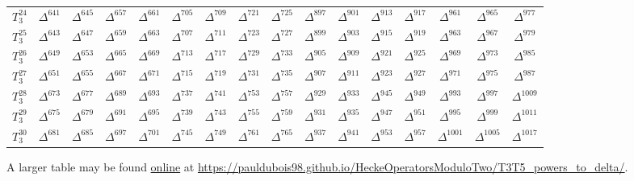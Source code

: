 \begin{center}
\begin{tabular}{|c||c|c|c|c|c|c|c|c|c|c|c|c|c|c|c|}
		$T_3^{24}$ & $\Delta^{641}$ & $\Delta^{645}$ & $\Delta^{657}$ & $\Delta^{661}$ & $\Delta^{705}$ & $\Delta^{709}$ & $\Delta^{721}$ & $\Delta^{725}$ & $\Delta^{897}$ & $\Delta^{901}$ & $\Delta^{913}$ & $\Delta^{917}$ & $\Delta^{961}$ & $\Delta^{965}$ & $\Delta^{977}$ \\
		$T_3^{25}$ & $\Delta^{643}$ & $\Delta^{647}$ & $\Delta^{659}$ & $\Delta^{663}$ & $\Delta^{707}$ & $\Delta^{711}$ & $\Delta^{723}$ & $\Delta^{727}$ & $\Delta^{899}$ & $\Delta^{903}$ & $\Delta^{915}$ & $\Delta^{919}$ & $\Delta^{963}$ & $\Delta^{967}$ & $\Delta^{979}$ \\
		$T_3^{26}$ & $\Delta^{649}$ & $\Delta^{653}$ & $\Delta^{665}$ & $\Delta^{669}$ & $\Delta^{713}$ & $\Delta^{717}$ & $\Delta^{729}$ & $\Delta^{733}$ & $\Delta^{905}$ & $\Delta^{909}$ & $\Delta^{921}$ & $\Delta^{925}$ & $\Delta^{969}$ & $\Delta^{973}$ & $\Delta^{985}$ \\
		$T_3^{27}$ & $\Delta^{651}$ & $\Delta^{655}$ & $\Delta^{667}$ & $\Delta^{671}$ & $\Delta^{715}$ & $\Delta^{719}$ & $\Delta^{731}$ & $\Delta^{735}$ & $\Delta^{907}$ & $\Delta^{911}$ & $\Delta^{923}$ & $\Delta^{927}$ & $\Delta^{971}$ & $\Delta^{975}$ & $\Delta^{987}$ \\
		$T_3^{28}$ & $\Delta^{673}$ & $\Delta^{677}$ & $\Delta^{689}$ & $\Delta^{693}$ & $\Delta^{737}$ & $\Delta^{741}$ & $\Delta^{753}$ & $\Delta^{757}$ & $\Delta^{929}$ & $\Delta^{933}$ & $\Delta^{945}$ & $\Delta^{949}$ & $\Delta^{993}$ & $\Delta^{997}$ & $\Delta^{1009}$ \\
		$T_3^{29}$ & $\Delta^{675}$ & $\Delta^{679}$ & $\Delta^{691}$ & $\Delta^{695}$ & $\Delta^{739}$ & $\Delta^{743}$ & $\Delta^{755}$ & $\Delta^{759}$ & $\Delta^{931}$ & $\Delta^{935}$ & $\Delta^{947}$ & $\Delta^{951}$ & $\Delta^{995}$ & $\Delta^{999}$ & $\Delta^{1011}$ \\
		$T_3^{30}$ & $\Delta^{681}$ & $\Delta^{685}$ & $\Delta^{697}$ & $\Delta^{701}$ & $\Delta^{745}$ & $\Delta^{749}$ & $\Delta^{761}$ & $\Delta^{765}$ & $\Delta^{937}$ & $\Delta^{941}$ & $\Delta^{953}$ & $\Delta^{957}$ & $\Delta^{1001}$ & $\Delta^{1005}$ & $\Delta^{1017}$ \\
		\hline
	\end{tabular}
\end{center}
A larger table may be found \href{https://pauldubois98.github.io/HeckeOperatorsModuloTwo/T3T5_powers_to_delta/}{online} at \url{https://pauldubois98.github.io/HeckeOperatorsModuloTwo/T3T5_powers_to_delta/}.



